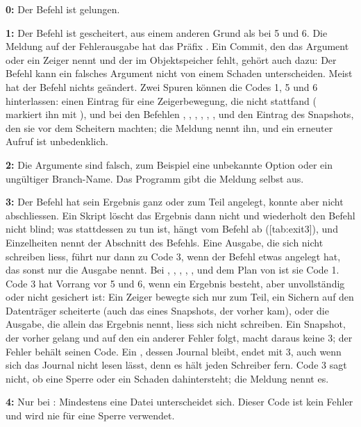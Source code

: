 \startitemize
\item {\bf 0:} Der Befehl ist gelungen.
\item {\bf 1:} Der Befehl ist gescheitert, aus einem anderen Grund als bei 5 und 6.
Die Meldung auf der Fehlerausgabe hat das Präfix .
Ein Commit, den das Argument oder ein Zeiger nennt und der im Objektspeicher fehlt,
gehört auch dazu: Der Befehl kann ein falsches Argument nicht von einem Schaden unterscheiden.
Meist hat der Befehl nichts geändert. Zwei Spuren können die Codes 1, 5 und 6 hinterlassen:
einen Eintrag für eine Zeigerbewegung,
die nicht stattfand ( markiert ihn mit \type{!}),
und bei den Befehlen , , , , ,
,  und 
den Eintrag des
Snapshots, den sie vor dem Scheitern machten; die Meldung nennt ihn, und ein erneuter
Aufruf ist unbedenklich.
\item {\bf 2:} Die Argumente sind falsch, zum Beispiel eine unbekannte Option oder
ein ungültiger Branch-Name. Das Programm gibt die Meldung selbst aus.
\item {\bf 3:} Der Befehl hat sein Ergebnis ganz oder zum Teil angelegt,
konnte aber nicht abschliessen.
Ein Skript löscht das Ergebnis dann nicht und wiederholt den Befehl nicht blind;
was stattdessen zu tun ist, hängt vom Befehl ab ([tab:exit3]),
und Einzelheiten nennt der Abschnitt des Befehls.
Eine Ausgabe, die sich nicht schreiben liess, führt nur dann zu Code 3,
wenn der Befehl etwas angelegt hat, das sonst nur die Ausgabe nennt.
Bei , , , , ,
 und dem Plan von  ist sie Code 1.
Code 3 hat Vorrang vor 5 und 6, wenn ein Ergebnis besteht, aber unvollständig oder nicht
gesichert ist: Ein Zeiger bewegte sich nur zum Teil, ein Sichern auf den Datenträger scheiterte
(auch das eines Snapshots, der vorher kam), oder die Ausgabe, die allein das Ergebnis nennt,
liess sich nicht schreiben. Ein Snapshot, der vorher gelang und auf den ein anderer Fehler folgt,
macht daraus keine 3; der Fehler behält seinen Code. Ein , dessen Journal bleibt,
endet mit 3, auch wenn sich das Journal nicht lesen lässt, denn es hält jeden Schreiber fern.
Code 3 sagt nicht, ob eine Sperre oder ein Schaden dahintersteht; die Meldung nennt es.
\item {\bf 4:} Nur bei : Mindestens eine Datei unterscheidet sich.
Dieser Code ist kein Fehler und wird nie für eine Sperre verwendet.
